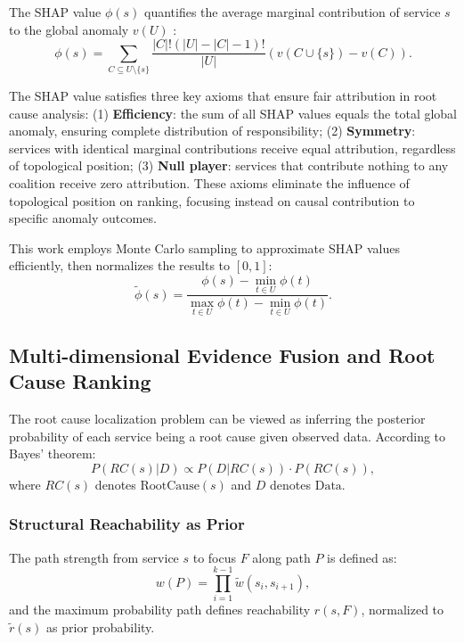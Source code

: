 \documentclass[conference]{IEEEtran}
\begin{document}
The SHAP value $\phi(s)$ quantifies the average marginal contribution of service $s$ to the global anomaly $v(U)$ \cite{shapley,lundberg2017}:
{\small
\begin{equation}
\phi(s) = \!\sum_{C \subseteq U \setminus\{s\}} \frac{|C|!(|U|\!-\!|C|\!-\!1)!}{|U|}(v(C \cup \{s\}) - v(C)).
\end{equation}}

The SHAP value satisfies three key axioms that ensure fair attribution in root cause analysis: (1) \textbf{Efficiency}: the sum of all SHAP values equals the total global anomaly, ensuring complete distribution of responsibility; (2) \textbf{Symmetry}: services with identical marginal contributions receive equal attribution, regardless of topological position; (3) \textbf{Null player}: services that contribute nothing to any coalition receive zero attribution. These axioms eliminate the influence of topological position on ranking, focusing instead on causal contribution to specific anomaly outcomes.

This work employs Monte Carlo sampling \cite{castro2009} to approximate SHAP values efficiently, then normalizes the results to $[0,1]$:
\begin{equation}
\tilde{\phi}(s) = \frac{\phi(s) - \min_{t \in U} \phi(t)}{\max_{t \in U} \phi(t) - \min_{t \in U} \phi(t)}.
\end{equation}

\subsection{Multi-dimensional Evidence Fusion and Root Cause Ranking}

The root cause localization problem can be viewed as inferring the posterior probability of each service being a root cause given observed data. According to Bayes' theorem:
\begin{equation}
P(RC(s) | D) \propto P(D | RC(s)) \cdot P(RC(s)),
\end{equation}
where $RC(s)$ denotes $\text{RootCause}(s)$ and $D$ denotes $\text{Data}$.

\subsubsection{Structural Reachability as Prior}

The path strength from service $s$ to focus $F$ along path $P$ is defined as:
\begin{equation}
w(P) = \prod_{i=1}^{k-1} \tilde{w}(s_i, s_{i+1}),
\end{equation}
and the maximum probability path defines reachability $r(s,F)$, normalized to $\tilde{r}(s)$ as prior probability.
\end{document}
